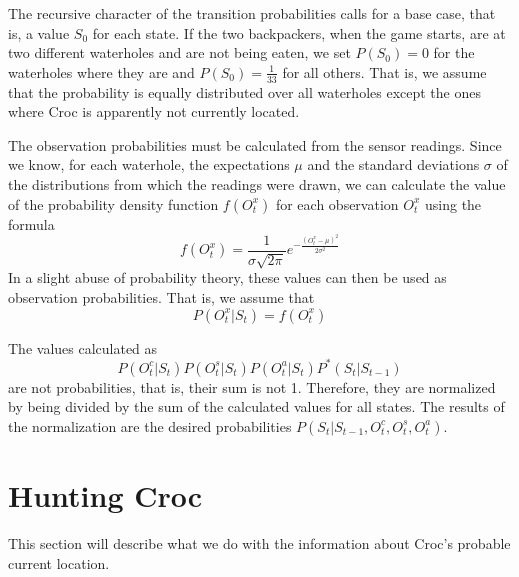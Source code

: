 \documentclass[a4paper]{article}
\begin{document}
The recursive character of
the transition probabilities calls for a base case, that is, a value $S_0$ for
each state. If the two backpackers, when the game starts, are at two different
waterholes and are not being eaten, we set $P(S_0) = 0$ for the waterholes
where they are and $P(S_0) = \frac{1}{33}$ for all others. That is, we assume
that the probability is equally distributed over all waterholes except the
ones where Croc is apparently not currently located.

The observation probabilities must be calculated from the sensor
readings. Since we know, for each waterhole, the expectations $\mu$ and the
standard deviations $\sigma$ of the distributions from which the readings were
drawn, we can calculate the value of the probability density function
$f(O^x_t)$ for each observation $O^x_t$ using the formula
\begin{equation*}
  f(O^x_t) = \frac{1}{\sigma \sqrt{2 \pi}}e^{-\frac{(O^x_t-\mu)^2}{2\sigma ^2}}
\end{equation*}
In a slight abuse of probability theory, these values can then be used as
observation probabilities. That is, we assume that
\begin{equation*}
  P(O^x_t|S_t) = f(O^x_t)
\end{equation*}

The values calculated as
\begin{equation*}
  P(O^c_t|S_t)P(O^s_t|S_t)P(O^a_t|S_t)P^*(S_t|S_{t-1})
\end{equation*}
are not probabilities, that is, their sum is not 1. Therefore, they are
normalized by being divided by the sum of the calculated values for all
states. The results of the normalization are the desired probabilities $P(S_t|S_{t-1}, O^c_t, O^s_t, O^a_t)$.

\section{Hunting Croc}
\label{hunt}

This section will describe what we do with the information about Croc's
probable current location.
\end{document}
